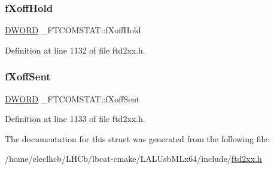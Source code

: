 \subsubsection{\texorpdfstring{f\+Xoff\+Hold}{fXoffHold}}
{\footnotesize\ttfamily \hyperlink{CatCaloProto40MHz_2inc_2WinTypes_8h_ad342ac907eb044443153a22f964bf0af}{D\+W\+O\+RD} \+\_\+\+F\+T\+C\+O\+M\+S\+T\+A\+T\+::f\+Xoff\+Hold}



Definition at line 1132 of file ftd2xx.\+h.

\mbox{\label{struct__FTCOMSTAT_a5a28cf3c2aea49110593931c78934416}} 
\subsubsection{\texorpdfstring{f\+Xoff\+Sent}{fXoffSent}}
{\footnotesize\ttfamily \hyperlink{CatCaloProto40MHz_2inc_2WinTypes_8h_ad342ac907eb044443153a22f964bf0af}{D\+W\+O\+RD} \+\_\+\+F\+T\+C\+O\+M\+S\+T\+A\+T\+::f\+Xoff\+Sent}



Definition at line 1133 of file ftd2xx.\+h.



The documentation for this struct was generated from the following file\+:\begin{DoxyCompactItemize}
\item 
/home/eleclhcb/\+L\+H\+Cb/lbcat-\/cmake/\+L\+A\+L\+Usb\+M\+Lx64/include/\hyperlink{LALUsbMLx64_2include_2ftd2xx_8h}{ftd2xx.\+h}\end{DoxyCompactItemize}
